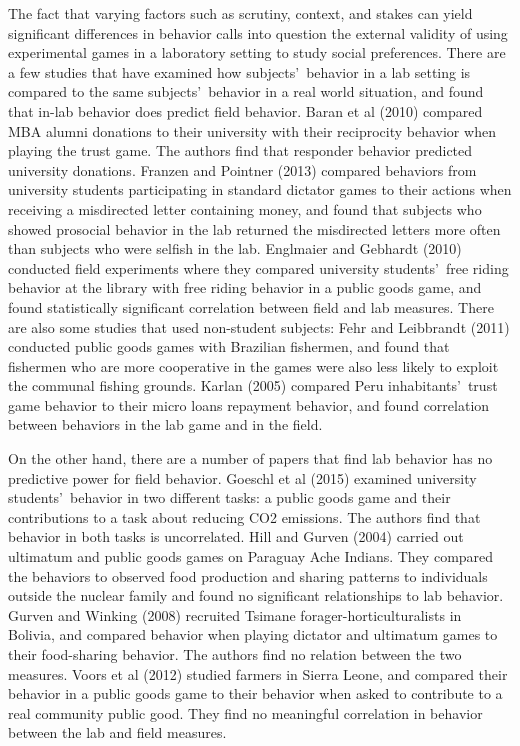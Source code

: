 \documentclass[12pt]{article}
\begin{document}
The fact that varying factors such as scrutiny, context, and stakes can yield significant differences in behavior calls into question the external validity of using experimental games in a laboratory setting to study social preferences. There are a few studies that have examined how subjects\rq \ behavior in a lab setting is compared to the same subjects\rq  \ behavior in a real world situation, and found that in-lab behavior does predict field behavior. Baran et al (2010) compared MBA alumni donations to their university with their reciprocity behavior when playing the trust game. The authors find that responder behavior predicted university donations. Franzen and Pointner (2013) compared behaviors from university students participating in standard dictator games to their actions when receiving a misdirected letter containing money, and found that subjects who showed prosocial behavior in the lab returned the misdirected letters more often than subjects who were selfish in the lab. Englmaier and Gebhardt (2010) conducted field experiments where they compared university students\rq \ free riding behavior at the library with free riding behavior in a public goods game, and found statistically significant correlation between field and lab measures. There are also some studies that used non-student subjects: Fehr and Leibbrandt (2011) conducted public goods games with Brazilian fishermen, and found that fishermen who are more cooperative in the games were also less likely to exploit the communal fishing grounds. Karlan (2005) compared Peru inhabitants\rq \ trust game behavior to their micro loans repayment behavior, and found correlation between behaviors in the lab game and in the field. 

On the other hand, there are a number of papers that find lab behavior has no predictive power for field behavior. Goeschl et al (2015) examined university students\rq \ behavior in two different tasks: a public goods game and their contributions to a task about reducing CO2 emissions. The authors find that behavior in both tasks is uncorrelated. Hill and Gurven (2004) carried out ultimatum and public goods games on Paraguay Ache Indians. They compared the behaviors to observed food production and sharing patterns to individuals outside the nuclear family and found no significant relationships to lab behavior. Gurven and Winking (2008) recruited Tsimane forager-horticulturalists in Bolivia, and compared behavior when playing dictator and ultimatum games to their food-sharing behavior. The authors find no relation between the two measures. Voors et al (2012) studied farmers in Sierra Leone, and compared their behavior in a public goods game to their behavior when asked to contribute to a real community public good. They find no meaningful correlation in behavior between the lab and field measures. 
\end{document}
